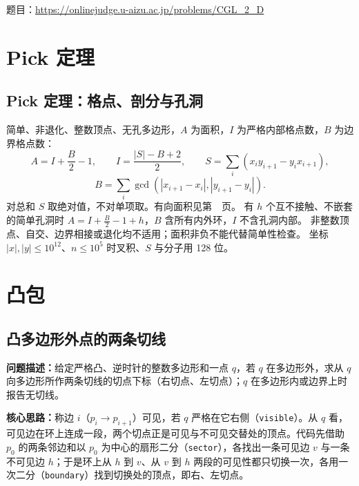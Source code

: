 题目：\url{https://onlinejudge.u-aizu.ac.jp/problems/CGL_2_D}



\newpage

\chapter{Pick 定理}

\section{Pick 定理：格点、剖分与孔洞}\label{knowledge-pick}
简单、非退化、整数顶点、无孔多边形，$A$ 为面积，$I$ 为严格内部格点数，$B$ 为边界格点数：
\[
A=I+\frac B2-1,\qquad I=\frac{|S|-B+2}{2},\qquad
S=\sum_i(x_i y_{i+1}-y_i x_{i+1}),
\]
\[
B=\sum_i\gcd(|x_{i+1}-x_i|,|y_{i+1}-y_i|).
\]
对总和 $S$ 取绝对值，不对单项取。有向面积见第~\pageref{compact-polygon_area2}~页。
有 $h$ 个互不接触、不嵌套的简单孔洞时 $A=I+\frac B2-1+h$，$B$ 含所有内外环，$I$ 不含孔洞内部。
非整数顶点、自交、边界相接或退化均不适用；面积非负不能代替简单性检查。
坐标 $|x|,|y|\le10^{12}$、$n\le10^5$ 时叉积、$S$ 与分子用 128 位。


\newpage

\Needspace{648pt}

\chapter{凸包}

\section{凸多边形外点的两条切线}\label{compact-convex_tangents_i64}

\noindent\textbf{问题描述：}\allowbreak 给定严格凸、逆时针的整数多边形和一点 $q$，若 $q$ 在多边形外，求从 $q$ 向多边形所作两条切线的切点下标（右切点、左切点）；$q$ 在多边形内或边界上时报告无切线。

\textbf{核心思路：}\allowbreak 称边 $i$（$p_i\to p_{i+1}$）可见，若 $q$ 严格在它右侧（\texttt{visible}）。从 $q$ 看，可见边在环上连成一段，两个切点正是可见与不可见交替处的顶点。代码先借助 $p_0$ 的两条邻边和以 $p_0$ 为中心的扇形二分（\texttt{sector}），各找出一条可见边 $v$ 与一条不可见边 $h$；于是环上从 $h$ 到 $v$、从 $v$ 到 $h$ 两段的可见性都只切换一次，各用一次二分（\texttt{boundary}）找到切换处的顶点，即右、左切点。

